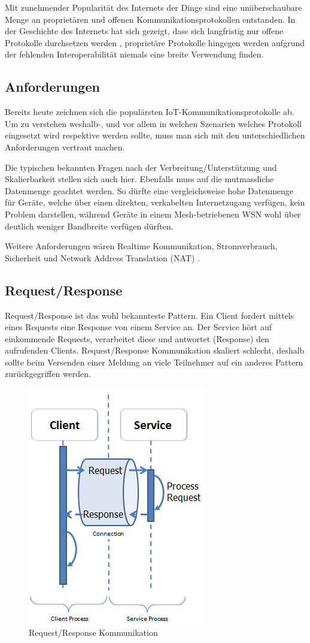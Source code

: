 Mit zunehmender Popularität des Internets der Dinge sind eine unüberschaubare Menge an proprietären und offenen Kommunikationsprotokollen entstanden. In der Geschichte des Internets hat sich gezeigt, dass sich langfristig nur offene Protokolle durchsetzen werden \cite{Obermaier14}, proprietäre Protokolle hingegen werden aufgrund der fehlenden Interoperabilität niemals eine breite Verwendung finden.
\subsection{Anforderungen}
Bereits heute zeichnen sich die populärsten IoT-Kommunikationsprotokolle ab. Um zu verstehen weshalb-, und vor allem in welchen Szenarien welches Protokoll eingesetzt wird respektive werden sollte, muss man sich mit den unterschiedlichen Anforderungen vertraut machen.

Die typischen bekannten Fragen nach der Verbreitung/Unterstützung und Skalierbarkeit stellen sich auch hier. Ebenfalls muss auf die mutmassliche Datenmenge geachtet werden. So dürfte eine vergleichsweise hohe Datenmenge für Geräte, welche über einen direkten, verkabelten Internetzugang verfügen, kein Problem darstellen, während Geräte in einem Mesh-betriebenen WSN wohl über deutlich weniger Bandbreite verfügen dürften.

Weitere Anforderungen wären Realtime Kommunikation, Stromverbrauch, Sicherheit und Network Address Translation (NAT) \cite{Obermaier15}.
\newpage
\subsection{Request/Response}
Request/Response ist das wohl bekannteste Pattern. Ein Client fordert mittels eines Requests eine Response von einem Service an. Der Service hört auf einkommende Requests, verarbeitet diese und antwortet (Response) den aufrufenden Clients. Request/Response Kommunikation skaliert schlecht, deshalb sollte beim Versenden einer Meldung an viele Teilnehmer auf ein anderes Pattern zurückgegriffen werden. 
\begin{figure}[H]
\centering
\includegraphics[scale=0.7]{../02_Analyse/images/request-response.png}
\caption{Request/Response Kommunikation \cite{ReqRes}}
\end{figure}
